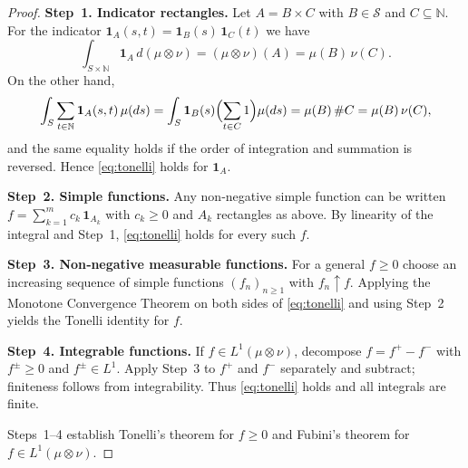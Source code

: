 \documentclass[11pt]{article}
\begin{document}
\begin{proof}
\break
\textbf{Step 1. Indicator rectangles.}\;
Let \(A=B\times C\) with \(B\in\mathcal{S}\) and \(C\subseteq\mathbb{N}\).
For the indicator \(\mathbf{1}_{A}(s,t)=\mathbf{1}_{B}(s)\,\mathbf{1}_{C}(t)\) we have
\[
\int_{S\times\mathbb{N}} \mathbf{1}_{A}\,d(\mu\otimes\nu)
   =(\mu\otimes\nu)(A)=\mu(B)\,\nu(C).
\]
On the other hand,
\[
\int_S \sum_{t\in\mathbb{N}}\mathbf{1}_{A}(s,t)\,\mu(ds)
   =\int_S \mathbf{1}_{B}(s)\Bigl(\sum_{t\in C}1\Bigr)\mu(ds)
   =\mu(B)\,\#C
   =\mu(B)\,\nu(C),
\]
and the same equality holds if the order of integration and summation is
reversed.  Hence \eqref{eq:tonelli} holds for \(\mathbf{1}_{A}\).

\smallskip
\textbf{Step 2. Simple functions.}\;
Any non‑negative simple function can be written
\(f=\sum_{k=1}^{m}c_k\,\mathbf{1}_{A_k}\) with \(c_k\ge 0\) and \(A_k\) rectangles
as above.  By linearity of the integral and Step 1, \eqref{eq:tonelli}
holds for every such \(f\).

\smallskip
\textbf{Step 3. Non‑negative measurable functions.}\;
For a general \(f\ge 0\) choose an increasing sequence of simple
functions \((f_n)_{n\ge 1}\) with \(f_n\uparrow f\).
Applying the Monotone Convergence Theorem on both sides of
\eqref{eq:tonelli} and using Step 2 yields the Tonelli identity for \(f\).

\smallskip
\textbf{Step 4. Integrable functions.}\;
If \(f\in L^{1}(\mu\otimes\nu)\), decompose \(f=f^{+}-f^{-}\) with
\(f^{\pm}\ge 0\) and \(f^{\pm}\in L^{1}\).
Apply Step 3 to \(f^{+}\) and \(f^{-}\) separately and subtract;
finiteness follows from integrability.  Thus \eqref{eq:tonelli} holds
and all integrals are finite.

\smallskip
Steps 1--4 establish Tonelli’s theorem for \(f\ge 0\) and Fubini’s
theorem for \(f\in L^{1}(\mu\otimes\nu)\).
\end{proof}
\end{document}
